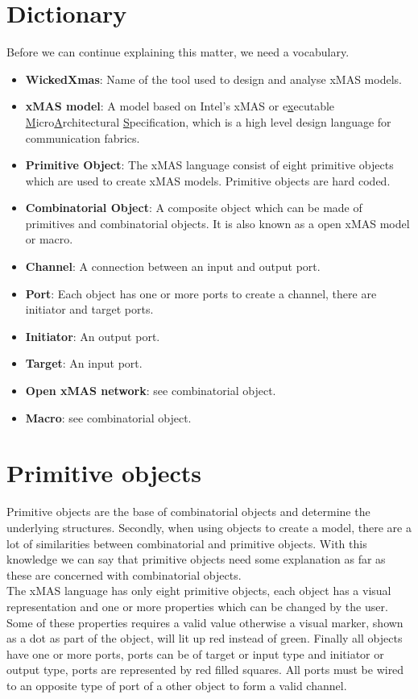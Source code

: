 \documentclass[a4paper,11pt,final]{article}
\begin{document}
\section{Dictionary} 
Before we can continue explaining this matter, we need a vocabulary. 
\begin{itemize}
\item \textbf{WickedXmas}: Name of the tool used to design and analyse xMAS models.
\item \textbf{xMAS model}: A model based on Intel's xMAS or e\underline{x}ecutable \underline{M}icro\underline{A}rchitectural \underline{S}pecification, which is a high level design language for communication fabrics. 
\item \textbf{Primitive Object}: The xMAS language consist of eight primitive objects which are used to create xMAS models. Primitive objects are hard coded.
\item \textbf{Combinatorial Object}: A composite object which can be made of primitives and combinatorial objects. It is also known as a open xMAS model or macro.
\item \textbf{Channel}: A connection between an input and output port.
\item \textbf{Port}: Each object has one or more ports to create a channel, there are initiator and target ports.
\item \textbf{Initiator}: An output port.
\item \textbf{Target}: An input port.
\item \textbf{Open xMAS network}: see combinatorial object.
\item \textbf{Macro}: see combinatorial object.


\end{itemize}


\newpage
\section{Primitive objects}
Primitive objects are the base of combinatorial objects and determine the underlying structures. Secondly, when using objects to create a model, there are a lot of similarities between combinatorial and primitive objects. With this knowledge we can say that primitive objects need some explanation as far as these are concerned with combinatorial objects.
\\The xMAS language has only eight primitive objects, each object has a visual representation and one or more properties which can be changed by the user. Some of these properties requires a valid value otherwise a visual marker, shown as a dot as part of the object, will lit up red instead of green. Finally all objects have one or more ports, ports can be of target or input type and initiator or output type, ports are represented by red filled squares. All ports must be wired to an opposite type of port of a other object to form a valid channel.
\end{document}
